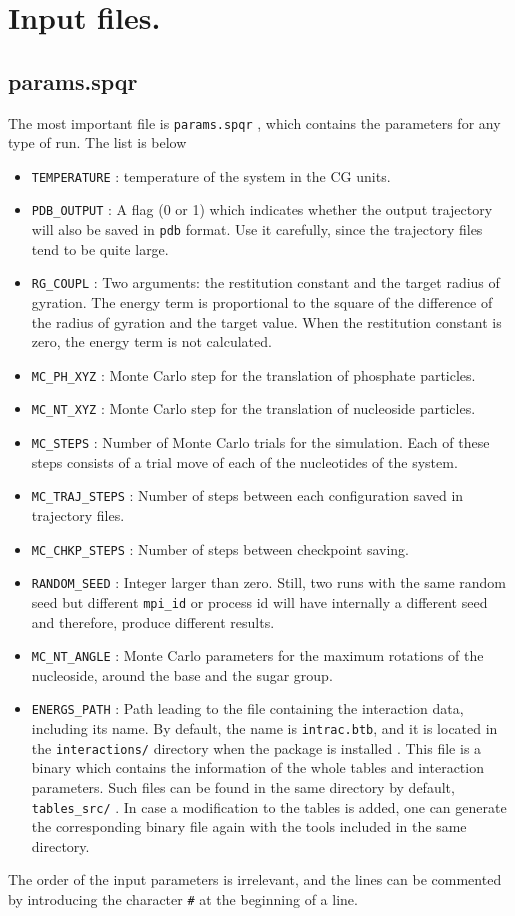 \documentclass{article}
\begin{document}
\section{Input files.}

\subsection{ params.spqr }

The most important file is \texttt{params.spqr} , which contains the parameters for any type of run. The list is below
\begin{itemize}
\item \texttt{TEMPERATURE} : temperature of the system in the CG units.
\item \texttt{PDB\_OUTPUT}   : A flag (0 or 1) which indicates whether the output trajectory will also be saved in \texttt{pdb} format. Use it carefully, since the trajectory files tend to be quite large.
\item \texttt{RG\_COUPL}   : Two arguments: the restitution constant and the target radius of gyration. The energy term is proportional to the square of the difference of the radius of gyration and the target value. When the restitution constant is zero, the energy term is not calculated.
\item \texttt{MC\_PH\_XYZ}   : Monte Carlo step for the translation of phosphate particles.
\item \texttt{MC\_NT\_XYZ}   : Monte Carlo step for the translation of nucleoside particles.
\item \texttt{MC\_STEPS}   : Number of Monte Carlo trials for the simulation. Each of these steps consists of a trial move of each of the nucleotides of the system.
\item \texttt{MC\_TRAJ\_STEPS} : Number of steps between each configuration saved in trajectory files.
\item \texttt{MC\_CHKP\_STEPS} : Number of steps between checkpoint saving.
\item \texttt{RANDOM\_SEED} : Integer larger than zero. Still, two runs with the same random seed but different \texttt{mpi\_id}  or process id will have internally a different seed and therefore, produce different results.
\item \texttt{MC\_NT\_ANGLE}   : Monte Carlo parameters for the maximum rotations of the nucleoside, around the base and the sugar group.
\item \texttt{ENERGS\_PATH}   : Path leading to the file containing the interaction data, including its name. By default, the name is \texttt{intrac.btb}, and it is located in the \texttt{interactions/} directory when the package is installed  . This file is a binary which contains the information of the whole tables and interaction parameters. Such files can be found in the same directory by default, \texttt{tables\_src/} . In case a modification to the tables is added, one can generate the corresponding binary file again with the tools included in the same directory.
\end{itemize}
The order of the input parameters is irrelevant, and the lines can be commented by introducing the character \texttt{\#}  at the beginning of a line.
\end{document}
